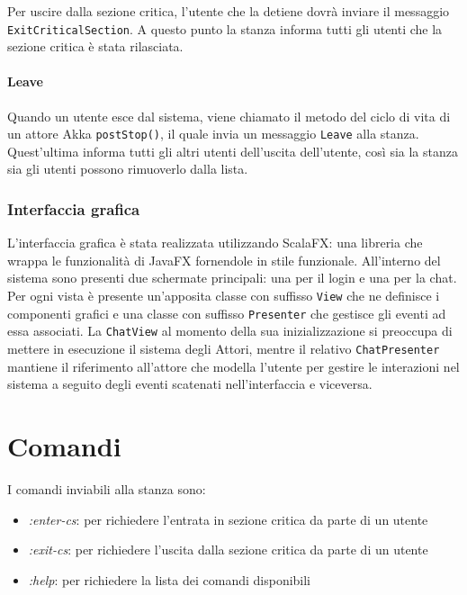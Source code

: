 \documentclass[a4paper]{report}
\begin{document}
Per uscire dalla sezione critica, l'utente che la detiene dovrà inviare il messaggio \texttt{ExitCriticalSection}. A questo punto la stanza informa tutti gli utenti che la sezione critica è stata rilasciata.

\paragraph{Leave}
Quando un utente esce dal sistema, viene chiamato il metodo del ciclo di vita di un attore Akka \texttt{postStop()}, il quale invia un messaggio \texttt{Leave} alla stanza. Quest'ultima informa tutti gli altri utenti dell'uscita dell'utente, così sia la stanza sia gli utenti possono rimuoverlo dalla lista.

\subsubsection{Interfaccia grafica}
L'interfaccia grafica è stata realizzata utilizzando ScalaFX: una libreria che wrappa le funzionalità di JavaFX fornendole in stile funzionale.
All'interno del sistema sono presenti due schermate principali: una per il login e una per la chat.\\
Per ogni vista è presente un'apposita classe con suffisso \texttt{View} che ne definisce i componenti grafici e una classe con suffisso \texttt{Presenter} che gestisce gli eventi ad essa associati.
La \texttt{ChatView} al momento della sua inizializzazione si preoccupa di mettere in esecuzione il sistema degli Attori, mentre il relativo \texttt{ChatPresenter} mantiene il riferimento all'attore che modella l'utente per gestire le interazioni nel sistema a seguito degli eventi scatenati nell'interfaccia e viceversa.

\newpage

\appendix
\section{Comandi}
I comandi inviabili alla stanza sono:
\begin{itemize}
    \item \textit{:enter-cs}: per richiedere l'entrata in sezione critica da parte di un utente
    \item \textit{:exit-cs}: per richiedere l'uscita dalla sezione critica da parte di un utente
    \item \textit{:help}: per richiedere la lista dei comandi disponibili
\end{itemize}

\end{document}
